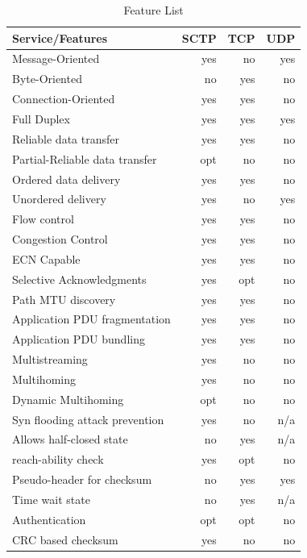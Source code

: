\documentclass[conference]{IEEEtran}
\begin{document}
\begin{table}
\begin{center}
\begin{tabular}{|l|r|r|r|}
\hline
Service/Features               & SCTP & TCP & UDP \\\hline
\hline
Message-Oriented               & yes  & no  & yes \\\hline 
Byte-Oriented                  & no   & yes & no  \\\hline
Connection-Oriented            & yes  & yes & no  \\\hline
Full Duplex                    & yes  & yes & yes \\\hline
Reliable data transfer         & yes  & yes & no  \\\hline
Partial-Reliable data transfer & opt  & no  & no  \\\hline
Ordered data delivery          & yes  & yes & no  \\\hline
Unordered delivery             & yes  & no  & yes \\\hline
Flow control                   & yes  & yes & no  \\\hline
Congestion Control             & yes  & yes & no  \\\hline
ECN Capable                    & yes  & yes & no  \\\hline
Selective Acknowledgments      & yes  & opt & no  \\\hline
Path MTU discovery             & yes  & yes & no  \\\hline
Application PDU fragmentation  & yes  & yes & no  \\\hline
Application PDU bundling       & yes  & yes & no  \\\hline
Multistreaming                 & yes  & no  & no  \\\hline
Multihoming                    & yes  & no  & no  \\\hline
Dynamic Multihoming            & opt  & no  & no  \\\hline
Syn flooding attack prevention & yes  & no  & n/a \\\hline
Allows half-closed state       & no   & yes & n/a \\\hline
reach-ability check            & yes  & opt & no  \\\hline
Pseudo-header for checksum     & no   & yes & yes \\\hline
Time wait state                & no   & yes & n/a \\\hline
Authentication                 & opt  & opt & no  \\\hline
CRC based checksum             & yes  & no  & no  \\\hline
\end{tabular}
\end{center}
\caption{Feature List \label{features}}
\end{table}
\end{document}
